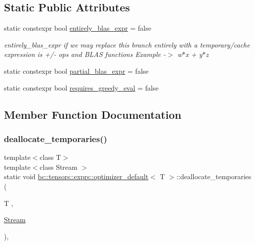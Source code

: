 \subsection*{Static Public Attributes}
\begin{DoxyCompactItemize}
\item 
static constexpr bool \hyperlink{structbc_1_1tensors_1_1exprs_1_1optimizer__default_ad6506251b58e383a7c9b50d04d4fb634}{entirely\+\_\+blas\+\_\+expr} = false
\begin{DoxyCompactList}\small\item\em entirely\+\_\+blas\+\_\+expr if we may replace this branch entirely with a temporary/cache expression is +/-\/ ops and B\+L\+AS functions Example -\/$>$ w$\ast$x + y$\ast$z \end{DoxyCompactList}\item 
static constexpr bool \hyperlink{structbc_1_1tensors_1_1exprs_1_1optimizer__default_aeab6375db3b27ee379b081b67bd62cf4}{partial\+\_\+blas\+\_\+expr} = false
\item 
static constexpr bool \hyperlink{structbc_1_1tensors_1_1exprs_1_1optimizer__default_af5e1f7d26972ce361a83e4b61319c1e4}{requires\+\_\+greedy\+\_\+eval} = false
\end{DoxyCompactItemize}


\subsection{Member Function Documentation}
\mbox{\label{structbc_1_1tensors_1_1exprs_1_1optimizer__default_a24f690395a20095018e132d15e18ee30}} 
\subsubsection{\texorpdfstring{deallocate\+\_\+temporaries()}{deallocate\_temporaries()}}
{\footnotesize\ttfamily template$<$class T$>$ \\
template$<$class Stream $>$ \\
static void \hyperlink{structbc_1_1tensors_1_1exprs_1_1optimizer__default}{bc\+::tensors\+::exprs\+::optimizer\+\_\+default}$<$ T $>$\+::deallocate\+\_\+temporaries (\begin{DoxyParamCaption}\item[{T}]{,  }\item[{\hyperlink{classbc_1_1streams_1_1Stream}{Stream}}]{ }\end{DoxyParamCaption})\hspace{0.3cm}{\ttfamily [inline]}, {\ttfamily [static]}}

